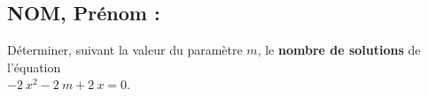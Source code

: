 \documentclass[a4paper,11pt,exos]{nsi} %
\begin{document}


\subsection*{NOM, Prénom : \dotfill} 

\maketitle


\begin{exercice}
    Déterminer, suivant la valeur du paramètre $m$, le \textbf{nombre de solutions} de l'équation\\ $-2~x^{2}-2~m+2~x=0$.
\end{exercice}

\end{document}
